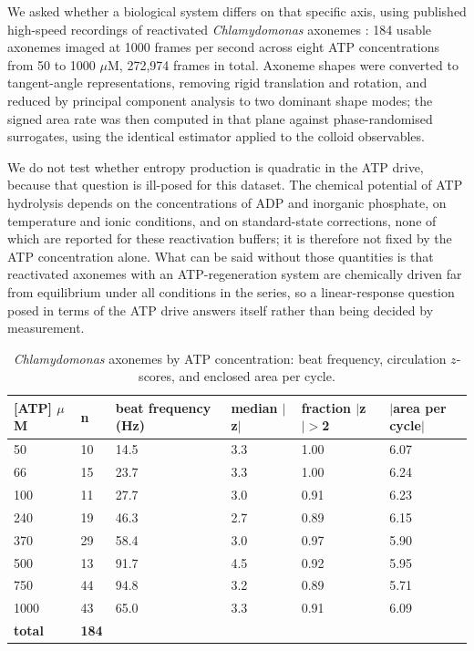 \documentclass[aps,pre,preprint,superscriptaddress,nofootinbib,longbibliography]{revtex4-2}
\begin{document}
We asked whether a biological system differs on that specific axis, using published high-speed recordings of reactivated \emph{Chlamydomonas} axonemes \cite{r6,r22}: 184 usable axonemes imaged at 1000 frames per second across eight ATP concentrations from 50 to 1000 $\mu$M, 272,974 frames in total. Axoneme shapes were converted to tangent-angle representations, removing rigid translation and rotation, and reduced by principal component analysis to two dominant shape modes; the signed area rate was then computed in that plane against phase-randomised surrogates, using the identical estimator applied to the colloid observables.

We do not test whether entropy production is quadratic in the ATP drive, because that question is ill-posed for this dataset. The chemical potential of ATP hydrolysis depends on the concentrations of ADP and inorganic phosphate, on temperature and ionic conditions, and on standard-state corrections, none of which are reported for these reactivation buffers; it is therefore not fixed by the ATP concentration alone. What can be said without those quantities is that reactivated axonemes with an ATP-regeneration system are chemically driven far from equilibrium under all conditions in the series, so a linear-response question posed in terms of the ATP drive answers itself rather than being decided by measurement.

\begin{table}[htbp]
\caption{\emph{Chlamydomonas} axonemes by ATP concentration: beat frequency, circulation $z$-scores, and enclosed area per cycle.}
\label{tab:18}
\begin{ruledtabular}
\begin{tabular}{p{2.00cm}p{1.85cm}p{2.33cm}p{2.00cm}p{2.33cm}p{2.39cm}}
\raggedright
[ATP] $\mu$M & n & beat frequency (Hz) & median $|$z$|$ & fraction $|$z$| >$2 & $|$area per cycle$|$ \\
\hline
50 & 10 & 14.5 & 3.3 & 1.00 & 6.07 \\
66 & 15 & 23.7 & 3.3 & 1.00 & 6.24 \\
100 & 11 & 27.7 & 3.0 & 0.91 & 6.23 \\
240 & 19 & 46.3 & 2.7 & 0.89 & 6.15 \\
370 & 29 & 58.4 & 3.0 & 0.97 & 5.90 \\
500 & 13 & 91.7 & 4.5 & 0.92 & 5.95 \\
750 & 44 & 94.8 & 3.2 & 0.89 & 5.71 \\
1000 & 43 & 65.0 & 3.3 & 0.91 & 6.09 \\
\textbf{total} & \textbf{184} &  &  &  &  \\
\end{tabular}
\end{ruledtabular}
\end{table}
\end{document}
